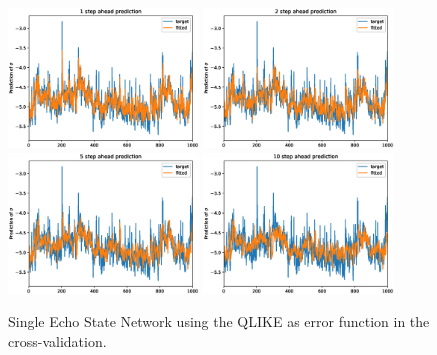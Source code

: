 \begin{figure}[H]
    \begin{center}
        \includegraphics[width=0.45\textwidth]{Plots/Prediction/Single_QLIKE_1step.eps}
        \includegraphics[width=0.45\textwidth]{Plots/Prediction/Single_QLIKE_2step.eps} \\
        \includegraphics[width=0.45\textwidth]{Plots/Prediction/Single_QLIKE_5step.eps}
        \includegraphics[width=0.45\textwidth]{Plots/Prediction/Single_QLIKE_10step.eps}
    \end{center}
    \caption{Single Echo State Network using the QLIKE as error function in the cross-validation.}
    \label{FIG:SingleESNQLIKE}
\end{figure}


